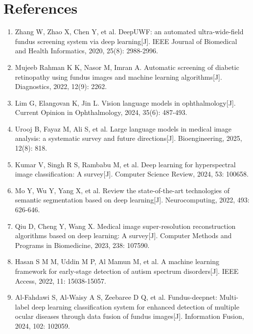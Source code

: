 \section*{References}

\begin{enumerate}
\def\labelenumi{\arabic{enumi}.}
\item
  \protect{}\label{_Ref213949315}{}Zhang W, Zhao X, Chen Y, et al. DeepUWF: an automated ultra-wide-field fundus screening system via deep learning{[}J{]}. IEEE Journal of Biomedical and Health Informatics, 2020, 25(8): 2988-2996.
\item
  \protect{}\label{_RefRahman2022MLFundus}{}Mujeeb Rahman K K, Nasor M, Imran A. Automatic screening of diabetic retinopathy using fundus images and machine learning algorithms{[}J{]}. Diagnostics, 2022, 12(9): 2262.
\item
  \protect{}\label{_RefLim2024VLVOphthalmology}{}Lim G, Elangovan K, Jin L. Vision language models in ophthalmology{[}J{]}. Current Opinion in Ophthalmology, 2024, 35(6): 487-493.
\item
  \protect{}\label{_RefUrooj2025LLMMedicalImage}{}Urooj B, Fayaz M, Ali S, et al. Large language models in medical image analysis: a systematic survey and future directions{[}J{]}. Bioengineering, 2025, 12(8): 818.
\item
  \protect{}\label{_Ref213871637}{}Kumar V, Singh R S, Rambabu M, et al. Deep learning for hyperspectral image classification: A survey{[}J{]}. Computer Science Review, 2024, 53: 100658.
\item
  \protect{}\label{_Ref213948625}{}Mo Y, Wu Y, Yang X, et al. Review the state-of-the-art technologies of semantic segmentation based on deep learning{[}J{]}. Neurocomputing, 2022, 493: 626-646.
\item
  \protect{}\label{_Ref213948898}{}Qiu D, Cheng Y, Wang X. Medical image super-resolution reconstruction algorithms based on deep learning: A survey{[}J{]}. Computer Methods and Programs in Biomedicine, 2023, 238: 107590.
\item
  \protect{}\label{_Ref213949262}{}Hasan S M M, Uddin M P, Al Mamun M, et al. A machine learning framework for early-stage detection of autism spectrum disorders{[}J{]}. IEEE Access, 2022, 11: 15038-15057.
\item
  \protect{}\label{_Ref213949362}{}Al-Fahdawi S, Al-Waisy A S, Zeebaree D Q, et al. Fundus-deepnet: Multi-label deep learning classification system for enhanced detection of multiple ocular diseases through data fusion of fundus images{[}J{]}. Information Fusion, 2024, 102: 102059.

\end{enumerate}

